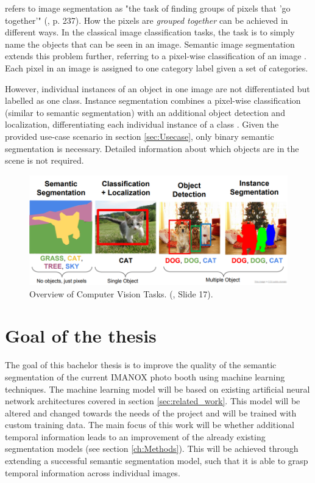 \documentclass[11pt,
  paper=a4, 
  bibliography=totocnumbered,
	captions=tableheading,
	BCOR=10mm
]{scrreprt}
\theoremstyle{definition}
\def \figwidth {0.9\linewidth}
\begin{document}
\textcite{Szeliski2011} refers to image segmentation as "the task of finding groups of pixels that 'go together'" (\cite{Szeliski2011}, p. 237).
How the pixels are \textit{grouped together} can be achieved in different ways.
In the classical image classification tasks, the task is to simply name the objects that can be seen in an image.
Semantic image segmentation extends this problem further, referring to a pixel-wise classification of an image \cite{Minaee2020}.
Each pixel in an image is assigned to one category label given a set of categories.

However, individual instances of an object in one image are not differentiated but labelled as one class.
Instance segmentation combines a pixel-wise classification (similar to semantic segmentation) with an additional object detection and localization, differentiating each individual instance of a class \cite{Minaee2020}.
Given the provided use-case scenario in section \ref{sec:Usecase}, only binary semantic segmentation is necessary.
Detailed information about which objects are in the scene is not required.

\begin{figure}[H]
	\centering
	\includegraphics[width=\figwidth]{Computer_Vision_Tasks}
	\caption[Overview of Computer Vision Tasks]{
		Overview of Computer Vision Tasks. (\textcite{Fei-Fei2017}, Slide 17).
		\label{fig:Computer_Vision_Tasks}}
\end{figure}


\section{Goal of the thesis}
The goal of this bachelor thesis is to improve the quality of the semantic segmentation of the current IMANOX photo booth using machine learning techniques.
The machine learning model will be based on existing artificial neural network architectures covered in section \ref{sec:related_work}.
This model will be altered and changed towards the needs of the project and will be trained with custom training data.
The main focus of this work will be whether additional temporal information leads to an improvement of the already existing segmentation models (see section \ref{ch:Methods}).
This will be achieved through extending a successful semantic segmentation model, such that it is able to grasp temporal information across individual images.
\end{document}
